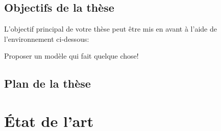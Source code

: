 \documentclass[french]{spimubephdthesis}
\begin{document}
\section{Objectifs de la thèse}

L'objectif principal de votre thèse peut être mis en avant à l'aide de l'environnement ci-dessous:

\begin{emphbox}
	Proposer un modèle qui fait quelque chose!
\end{emphbox}

\section{Plan de la thèse}

\chapter{\'Etat de l'art}
\end{document}
